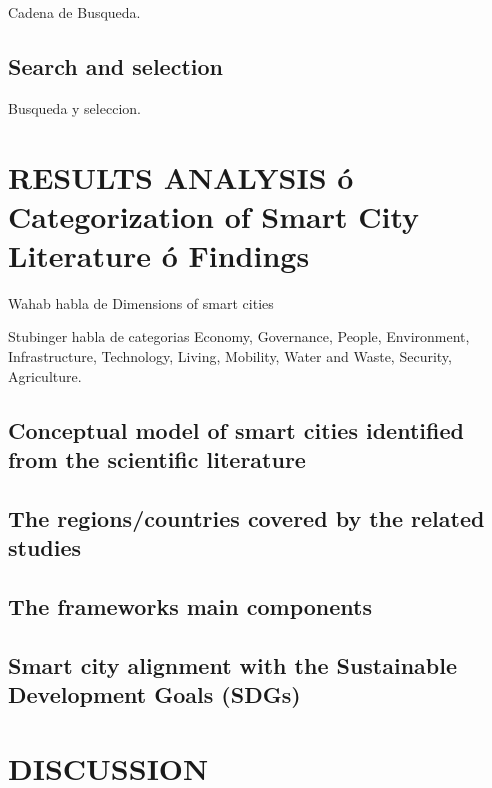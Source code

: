 \documentclass[a4paper,fleqn,spanish]{cas-dc}
\begin{document}
Cadena de Busqueda.


\subsection{Search and selection}\label{seleccion}

Busqueda y seleccion.


\section{RESULTS ANALYSIS ó Categorization of Smart City Literature ó Findings}\label{resultados}

Wahab habla de Dimensions of smart cities \cite{wahab_systematic_2020}

Stubinger habla de categorias \cite{stubinger_understanding_2020}
Economy,
Governance,
People,
Environment,
Infrastructure,
Technology,
Living,
Mobility,
Water and Waste,
Security, 
Agriculture.


\subsection{Conceptual model of smart cities identified from the scientific literature}\label{sci-lit}


\subsection{The regions/countries covered by the related studies}\label{regiones}



\subsection{The frameworks main components}\label{componentes}



\subsection{Smart city alignment with the Sustainable Development Goals (SDGs)}\label{sustentabilidad}


\section{DISCUSSION}\label{discusion}
\end{document}
